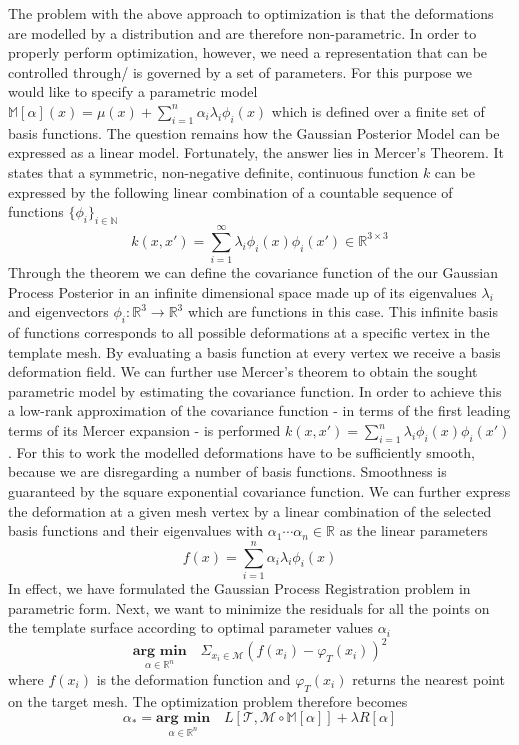 The problem with the above approach to optimization is that the deformations are modelled by a distribution and are therefore non-parametric. In order to properly perform optimization, however, we need a representation that can be controlled through/ is governed by a set of parameters. For this purpose we would like to specify a parametric model $\mathbb{M}[\alpha](x)=\mu(x)+ \sum^{n}_{i=1} \alpha_{i}\lambda_{i}\phi_{i}(x)$ which is defined over a finite set of basis
functions. The question remains how the Gaussian Posterior Model can be expressed as a linear model. Fortunately, the answer lies in Mercer's Theorem. It states that a symmetric, non-negative definite, continuous function $k$ can be expressed by the following linear combination of a countable sequence of functions $\{\phi_{i}\}_{i \in \mathbb{N}}$
\begin{equation}
    k(x,x') = \sum^{\infty}_{i=1}\lambda_{i}\phi_{i}(x)\phi_{i}(x') \in \mathbb{R}^{3 \times 3}
\end{equation}
Through the theorem we can define the covariance function of the our Gaussian Process Posterior in an infinite dimensional space made up of its eigenvalues $\lambda_{i}$ and eigenvectors $\phi_{i}: \mathbb{R}^3 \rightarrow \mathbb{R}^3$ which are functions in this case.
This infinite basis of functions corresponds to all possible deformations at a specific vertex in the template mesh. By evaluating a basis function at every vertex we receive a basis deformation field. We can further use Mercer's theorem to obtain the sought parametric model by estimating the covariance function. In order to achieve this a low-rank approximation of the covariance function - in terms of the first leading terms of its Mercer expansion - is performed $k(x,x') =
\sum^{n}_{i=1}\lambda_{i}\phi_{i}(x)\phi_{i}(x')$. For this to work the modelled deformations have to be sufficiently smooth, because we are disregarding a number of basis functions. Smoothness is guaranteed by the square exponential covariance function.
We can further express the deformation at a given mesh vertex by a linear combination of the selected basis functions and their eigenvalues with $\alpha_{1} \cdots \alpha_{n} \in \mathbb{R}$ as the linear parameters
\begin{equation}
f(x) = \sum^{n}_{i=1} \alpha_{i}\lambda_{i}\phi_{i}(x)
\end{equation}
In effect, we have formulated the Gaussian Process Registration problem in parametric form. Next, we want to minimize the residuals for all the points on the template surface according to optimal parameter values $\alpha_{i}$ 
\begin{equation}
    \underset{\alpha \in \mathbb{R}^n}{\textbf{arg min}}\quad \Sigma_{x_{i} \in \mathcal{M}} (f(x_{i}) - \varphi_{T}(x_{i}))^2
\end{equation}
where $f(x_{i})$ is the deformation function and $\varphi_{T}(x_{i})$ returns the nearest point on the target mesh. The optimization problem therefore becomes
\begin{equation}
    \alpha_{*} = \underset{\alpha \in \mathbb{R}^n}{\textbf{arg min}}\quad L[\mathcal{T}, \mathcal{M }\circ \mathbb{M}[\alpha]]+\lambda R[\alpha]
\end{equation}

